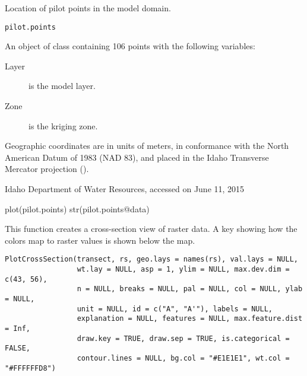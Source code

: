 \documentclass[a4paper]{book}
\begin{document}
%
\begin{Description}\relax
Location of pilot points in the model domain.
\end{Description}
%
\begin{Usage}
\begin{verbatim}
pilot.points
\end{verbatim}
\end{Usage}
%
\begin{Format}
An object of  class containing 106 points with the following variables:
\begin{description}

\item[Layer] is the model layer.
\item[Zone] is the kriging zone.

\end{description}

Geographic coordinates are in units of meters, in conformance with the North American Datum of 1983 (NAD 83), and placed in the
Idaho Transverse Mercator projection ().
\end{Format}
%
\begin{Source}\relax
Idaho Department of Water Resources, accessed on June 11, 2015
\end{Source}
%
\begin{SeeAlso}\relax
{}
\end{SeeAlso}
%
\begin{Examples}
\begin{ExampleCode}
plot(pilot.points)
str(pilot.points@data)
\end{ExampleCode}
\end{Examples}
%
\begin{Description}\relax
This function creates a cross-section view of raster data.
A key showing how the colors map to raster values is shown below the map.
\end{Description}
%
\begin{Usage}
\begin{verbatim}
PlotCrossSection(transect, rs, geo.lays = names(rs), val.lays = NULL,
                 wt.lay = NULL, asp = 1, ylim = NULL, max.dev.dim = c(43, 56),
                 n = NULL, breaks = NULL, pal = NULL, col = NULL, ylab = NULL,
                 unit = NULL, id = c("A", "A'"), labels = NULL,
                 explanation = NULL, features = NULL, max.feature.dist = Inf,
                 draw.key = TRUE, draw.sep = TRUE, is.categorical = FALSE,
                 contour.lines = NULL, bg.col = "#E1E1E1", wt.col = "#FFFFFFD8")
\end{verbatim}
\end{Usage}
\end{document}
